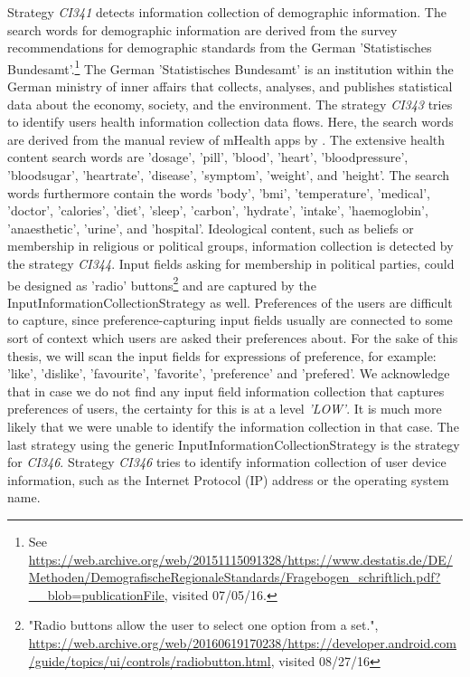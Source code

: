Strategy \textit{CI341} detects information collection of demographic information.
The search words for demographic information are derived from the survey recommendations for demographic standards from the German 'Statistisches Bundesamt'.\footnote{\raggedright See \url{https://web.archive.org/web/20151115091328/https://www.destatis.de/DE/Methoden/DemografischeRegionaleStandards/Fragebogen_schriftlich.pdf?__blob=publicationFile}, visited 07/05/16.}
The German 'Statistisches Bundesamt' is an institution within the German ministry of inner affairs that collects, analyses, and publishes statistical data about the economy, society, and the environment.
The strategy \textit{CI343} tries to identify users health information collection data flows.
Here, the search words are derived from the manual review of mHealth apps by \textcite{Bruggemann2016}. 
The extensive health content search words are 'dosage', 'pill', 'blood', 'heart', 'bloodpressure', 'bloodsugar', 'heartrate', 'disease', 'symptom', 'weight', and 'height'.
The search words furthermore contain the words 'body', 'bmi', 'temperature', 'medical', 'doctor', 'calories', 'diet', 'sleep', 'carbon', 'hydrate', 'intake', 'haemoglobin', 'anaesthetic', 'urine', and 'hospital'.
Ideological content, such as beliefs or membership in religious or political groups, information collection is detected by the strategy \textit{CI344}.
Input fields asking for membership in political parties, could be designed as 'radio' buttons\footnote{\raggedright"Radio buttons allow the user to select one option from a set.", \url{https://web.archive.org/web/20160619170238/https://developer.android.com/guide/topics/ui/controls/radiobutton.html}, visited 08/27/16} and are captured by the InputInformationCollectionStrategy as well.
Preferences of the users are difficult to capture, since preference-capturing input fields usually are connected to some sort of context which users are asked their preferences about.
For the sake of this thesis, we will scan the input fields for expressions of preference, for example: 'like', 'dislike', 'favourite', 'favorite', 'preference' and 'prefered'.
We acknowledge that in case we do not find any input field information collection that captures preferences of users, the certainty for this is at a level \textit{'LOW'}.
It is much more likely that we were unable to identify the information collection in that case.
The last strategy using the generic InputInformationCollectionStrategy is the strategy for \textit{CI346}. 
Strategy \textit{CI346} tries to identify information collection of user device information, such as the Internet Protocol (\acs{IP}) address or the operating system name.

